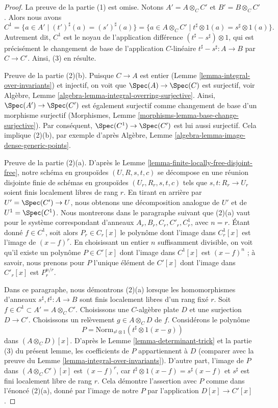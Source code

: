 \begin{proof}
La preuve de la partie (1) est omise. Notons $A' = A \otimes_C C'$ et
$B' = B \otimes_C C'$. Alors nous avons
$$
C^1
= \{a \in A' \mid (t')^\sharp(a) = (s')^\sharp(a) \}
= \{a \in A \otimes_C C' \mid t^\sharp \otimes 1(a) = s^\sharp \otimes 1(a) \}.
$$
Autrement dit, $C^1$ est le noyau de l'application différence
$(t^\sharp - s^\sharp) \otimes 1$, qui est précisément le changement de base
de l'application $C$-linéaire $t^\sharp - s^\sharp : A \to B$ par $C \to C'$.
Ainsi, (3) en résulte.

\medskip\noindent
Preuve de la partie (2)(b). Puisque $C \to A$ est entier
(Lemme \ref{lemma-integral-over-invariants}) et injectif, on voit que
$\Spec(A) \to \Spec(C)$ est surjectif, voir
Algèbre, Lemme \ref{algebra-lemma-integral-overring-surjective}.
Ainsi, $\Spec(A') \to \Spec(C')$ est également surjectif
comme changement de base d'un morphisme surjectif
(Morphismes, Lemme \ref{morphisms-lemma-base-change-surjective}).
Par conséquent, $\Spec(C^1) \to \Spec(C')$ est lui aussi surjectif.
Cela implique (2)(b), par exemple d'après
Algèbre, Lemme \ref{algebra-lemma-image-dense-generic-points}.

\medskip\noindent
Preuve de la partie (2)(a). D'après le Lemme \ref{lemma-finite-locally-free-disjoint-free},
notre schéma en groupoïdes $(U, R, s, t, c)$ se décompose en une réunion disjointe finie
de schémas en groupoïdes $(U_r, R_r, s, t, c)$ tels que $s, t : R_r \to U_r$
soient finis localement libres de rang $r$. En tirant en arrière par $U' = \Spec(C') \to U$,
nous obtenons une décomposition analogue de $U'$ et de $U^1 = \Spec(C^1)$.
Nous montrerons dans le paragraphe suivant que (2)(a) vaut pour le système correspondant
d'anneaux $A_r, B_r, C_r, C'_r, C^1_r$, avec $n = r$.
Étant donné $f \in C^1$, soit alors $P_r \in C_r[x]$ le polynôme
dont l'image dans $C^1_r[x]$ est l'image de $(x - f)^r$.
En choisissant un entier $n$ suffisamment divisible, on voit qu'il
existe un polynôme $P \in C'[x]$ dont l'image dans $C^1[x]$ est
$(x - f)^n$ ; à savoir, nous prenons pour $P$ l'unique élément de
$C'[x]$ dont l'image dans $C'_r[x]$ est $P_r^{n/r}$.

\medskip\noindent
Dans ce paragraphe, nous démontrons (2)(a) lorsque les homomorphismes d'anneaux
$s^\sharp, t^\sharp : A \to B$ sont finis localement libres d'un rang fixé $r$.
Soit $f \in C^1 \subset A' = A \otimes_C C'$. Choisissons une
$C$-algèbre plate $D$ et une surjection $D \to C'$. Choisissons un relèvement
$g \in A \otimes_C D$ de $f$.
Considérons le polynôme
$$
P = \text{Norm}_{s^\sharp \otimes 1}(t^\sharp \otimes 1(x - g))
$$
dans $(A \otimes_C D)[x]$. D'après le Lemme \ref{lemma-determinant-trick}
et la partie (3) du présent lemme, les coefficients de $P$ appartiennent à $D$
(comparer avec la preuve du Lemme \ref{lemma-integral-over-invariants}).
D'autre part, l'image de $P$ dans $(A \otimes_C C')[x]$ est
$(x - f)^r$, car $t^\sharp \otimes 1(x - f) = s^\sharp(x - f)$
et $s^\sharp$ est fini localement libre de rang $r$.
Cela démontre l'assertion avec $P$ comme dans l'énoncé (2)(a),
donné par l'image de notre $P$ par l'application $D[x] \to C'[x]$.
\end{proof}

